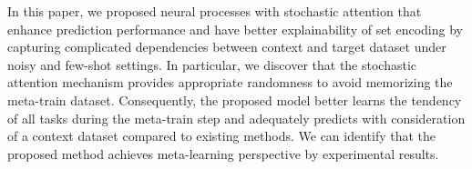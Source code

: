 In this paper, we proposed neural processes with stochastic attention that enhance prediction performance and have better explainability of set encoding by capturing complicated dependencies between context and target dataset under noisy and few-shot settings. In particular, we discover that the stochastic attention mechanism provides appropriate randomness to avoid memorizing the meta-train dataset. 
Consequently, the proposed model better learns the tendency of all tasks during the meta-train step and adequately predicts with consideration of a context dataset compared to existing methods. We can identify that the proposed method achieves meta-learning perspective by experimental results. 

 